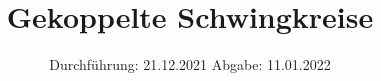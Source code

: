 

\subject{V355}
\title{Gekoppelte Schwingkreise}
\date{%
  Durchführung: 21.12.2021
  \hspace{3em}
  Abgabe: 11.01.2022
}



\maketitle
\thispagestyle{empty}
\tableofcontents
\newpage






\printbibliography{}




